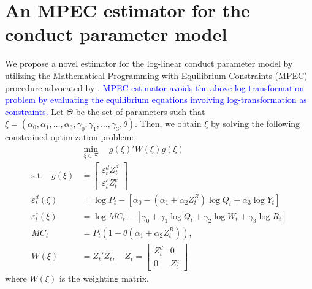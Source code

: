 \documentclass[11pt, a4paper]{article}
\begin{document}

\section{An MPEC estimator for the conduct parameter model}

We propose a novel estimator for the log-linear conduct parameter model by utilizing the Mathematical Programming with Equilibrium Constraints (MPEC) procedure advocated by \cite{su2012constrained}. \textcolor{blue}{MPEC estimator avoids the above log-transformation problem by evaluating the equilibrium equations involving log-transformation as constraints.} Let $\Theta$ be the set of parameters such that $\xi = (\alpha_0,\alpha_1, \ldots, \alpha_3, \gamma_0,\gamma_1, \ldots, \gamma_3, \theta)$. Then, we obtain $\xi$ by solving the following constrained optimization problem:
\begin{align}
    &\min_{\xi \in \Xi}\quad g(\xi)' W(\xi) g(\xi) \\
    \text{s.t.}\quad g(\xi)&=\left[\begin{array}{l}
\varepsilon^{d}_{t}Z_{t}^{d} \\
\varepsilon^{c}_{t}Z_{t}^{c}
\end{array}\right]\\
    \varepsilon^{d}_{t}(\xi)&=\log P_{t} -[\alpha_0 - (\alpha_1 + \alpha_2 Z^{R}_{t}) \log Q_t + \alpha_3 \log Y_t] \\
    \varepsilon^{c}_{t} (\xi)&= \log MC_t -[\gamma_0 + \gamma_1 \log Q_t +  \gamma_2 \log W_{t} + \gamma_3 \log R_t]\\
    MC_t &= P_t(1 - \theta (\alpha_1 + \alpha_2 Z^{R}_{t})),\\
    W(\xi)&=Z_{t}'Z_{t}, \quad Z_{t}=\left[\begin{array}{ll}
Z_{t}^{d} & 0 \\
0 & Z_{t}^{c}
\end{array}\right]
\end{align}
where $W(\xi)$ is the weighting matrix. 
\end{document}
